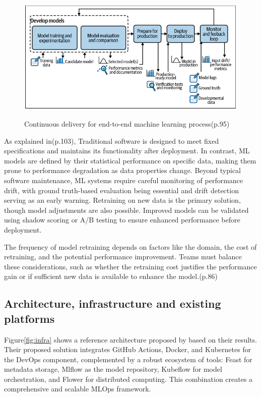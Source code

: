 \begin{figure}[!htbp]
    \caption{Continuous delivery for end-to-end machine learning process\cite{treveil2020introducing}(p.95)}
    \centering
    \includegraphics[scale=0.5]{images/feedback-loop-intro}
    \label{fig:feedback-loop-intro}
\end{figure}


As explained in\cite{treveil2020introducing}(p.103), Traditional software is designed to meet fixed specifications and maintains its functionality after deployment.
In contrast, ML models are defined by their statistical performance on specific data, making them prone to performance degradation as data properties change.
Beyond typical software maintenance, ML systems require careful monitoring of performance drift,
with ground truth-based evaluation being essential and drift detection serving as an early warning.
Retraining on new data is the primary solution, though model adjustments are also possible.
Improved models can be validated using shadow scoring or A/B testing to ensure enhanced performance before deployment.

The frequency of model retraining depends on factors like the domain, the cost of retraining, and the potential performance improvement.
Teams must balance these considerations, such as whether the retraining cost justifies the performance gain or if sufficient new data is available to enhance the model.\cite{treveil2020introducing}(p.86)

\subsection{Architecture, infrastructure and existing platforms}\label{subsec:architecture-infrastructure-and-existing-platforms}
Figure\ref{fig:infra} shows a reference architecture proposed by\cite{10855428} based on their results.
Their proposed solution integrates GitHub Actions, Docker, and Kubernetes for the DevOps component, complemented by a robust ecosystem of tools:
Feast for metadata storage, Mlflow as the model repository, Kubeflow for model orchestration, and Flower for distributed computing.
This combination creates a comprehensive and scalable MLOps framework.

